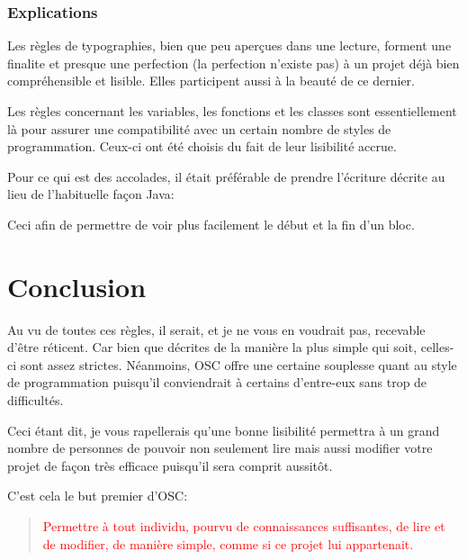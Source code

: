 \documentclass[a4paper,12pt]{report}
\begin{document}
\subsection{Explications}
Les règles de typographies, bien que peu aperçues dans une lecture, 
forment une finalite et presque une perfection (la perfection n'existe 
pas) à un projet déjà bien compréhensible et lisible. Elles participent 
aussi à la beauté de ce dernier.\newline

Les règles concernant les variables, les fonctions et les classes sont 
essentiellement là pour assurer une compatibilité avec un certain 
nombre de styles de programmation. Ceux-ci ont été choisis du fait de 
leur lisibilité accrue.\newline

Pour ce qui est des accolades, il était préférable de prendre 
l'écriture décrite au lieu de l'habituelle façon Java:
\begin{center}
    \begin{minipage}{2.1764in}
        
    \end{minipage}
\end{center}
Ceci afin de permettre de voir plus facilement le début et la fin 
d'un bloc.

\chapter{Conclusion}
Au vu de toutes ces règles, il serait, et je ne vous en voudrait pas, 
recevable d'être réticent. Car bien que décrites de la manière la plus 
simple qui soit, celles-ci sont assez strictes. Néanmoins, OSC offre 
une certaine souplesse quant au style de programmation puisqu'il 
conviendrait à certains d'entre-eux sans trop de difficultés.\newline

Ceci étant dit, je vous rapellerais qu'une bonne lisibilité permettra 
à un grand nombre de personnes de pouvoir non seulement lire mais aussi 
modifier votre projet de façon très efficace puisqu'il sera comprit 
aussitôt.\newline

C'est cela le but premier d'OSC:\newline

\fbox
{
    \begin{minipage}[c]{17cm}
    \begin{quote}
    \begin{bf}
    \textcolor{red}
    {
        Permettre à tout individu, pourvu de connaissances suffisantes, 
        de lire et de modifier, de manière simple, comme si ce projet 
        lui appartenait.
    }
    \end{bf}
    \end{quote}
    \end{minipage}
}
\end{document}
